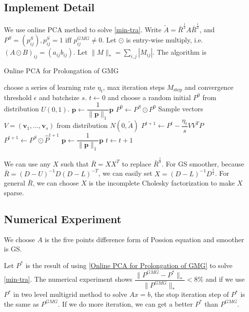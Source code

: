 \subsection{Implement Detail}
We use online PCA method to solve \eqref{min-tra}. Write $\tilde{A} = \bar{R}^{\frac 12}A\bar{R}^{\frac 12}$, and $P^S = (p^S_{ij}), p^S_{ij}=1 \text{ iff } p^{GMG}_{ij}\neq 0$. Let $\odot$ is entry-wise multiply, i.e.$(A\odot B)_{ij}=(a_{ij}b_{ij})$. Let $\|M\|_*=\sum_{i,j} |M_{ij}|$.
The algorithm is 
\begin{algorithm}  
	\caption{Online PCA for Prolongation of GMG}  
	\label{Online PCA for Prolongation of GMG}  
	\begin{algorithmic}  
		\STATE choose a series of learning rate $\eta_t$, max iteration steps $M_{\text{step}}$ and convergence threshold $\epsilon$ and batchsize $s$.
		\STATE $t \leftarrow 0$ and choose a random initial $P^0$ from distribution $U(0,1)$.
		\STATE $\mathbf p \leftarrow \dfrac 1{\|\mathbf p\|_1}\mathbf{p}$
		\ENDFOR
		\STATE $P^0\leftarrow P^S\odot P^0$ 
		\REPEAT  
		\STATE Sample vectors $V=(\mathbf v_1,...,\mathbf v_s)$ from distribution $N(0,\tilde{A})$
		\STATE $P^{t+1} \leftarrow P^t - \dfrac{\eta_t}{s} V V^T P$
		\STATE $P^{t+1}\leftarrow P^S\odot \hat{P}^{t+1}$
		\STATE $\mathbf p \leftarrow \dfrac 1{\|\mathbf p\|_1}\mathbf{p}$
		\ENDFOR
		\STATE $t\leftarrow t+1$
	\end{algorithmic}  
\end{algorithm}  
\begin{remark}
	We can use any $X$ such that $\bar{R} =XX^T$ to replace $\bar{R}^\frac{1}{2}$. For GS smoother, because $\bar{R}=(D-U)^{-1}D(D-L)^{-T}$, we can easily set $X=(D-L)^{-1}D^\frac 12$. For general $\bar{R}$, we can choose $X$ is the incomplete Cholesky factorization to make $X$ sparse.
\end{remark}
\newpage
\subsection{Numerical Experiment}
We choose $A$ is the five points  difference form of Possion equation and smoother is GS.

Let $P^*$ is the result of using \eqref{Online PCA for Prolongation of GMG} to solve \eqref{min-tra}. The numerical experiment shows $\dfrac{\|P^{GMG}-P^*\|_*}{\|P^{GMG}\|_*}<8\%$ and if we use $P^*$ in two level multigrid method to solve $Ax=b$, the stop iteration step of $P^*$ is the same as $P^{GMG}$. If we do more iteration, we can get a better  $P^*$ than $P^{GMG}$.



